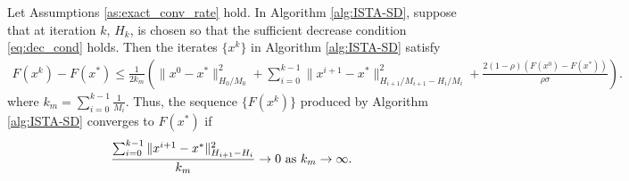 \documentclass[11pt]{article}
\numberwithin{equation}{section}
\begin{document}
 

\begin{theorem}\label{the:ISTA-SD}
Let Assumptions \ref{as:exact_conv_rate} hold. In Algorithm \ref{alg:ISTA-SD}, suppose that at iteration $k$,  $H_k$, is chosen so that the sufficient decrease condition \eqref{eq:dec_cond} holds.
Then the iterates $\{x^k\}$ in Algorithm \ref{alg:ISTA-SD} satisfy
\begin{align}
    \label{the:ISTA-nonsmooth-conclude} 
    F(x^k) - F(x^*) \leq \frac{1}{2k_m}  \left( \|x^0-x^*\|_{H_0/M_0}^2 + \sum_{i=0}^{k-1}\|x^{i+1} - x^*\|_{H_{i+1}/M_{i+1}-H_i/M_i}^2 + \frac{2(1-\rho)(F(x^0)-F(x^*))}{\rho\sigma}\right).
\end{align}
where $k_m = \sum_{i=0}^{k-1} \frac{1}{M_i}$. Thus, the sequence $\{F(x^k)\}$ produced by Algorithm \ref{alg:ISTA-SD} converges to $F(x^*)$ if  
\[
\frac{\sum_{i=0}^{k-1}\|x^{i+1} - x^*\|_{H_{i+1}-H_i}^2}{k_m} \to 0\ {\rm as\ } k_m\to \infty.
\]
\end{theorem}
\end{document}

